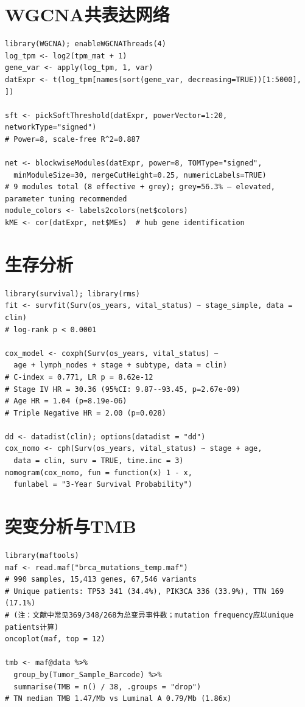 \documentclass[12pt,a4paper,openany]{ctexbook}
\begin{document}
\section{WGCNA共表达网络}
\begin{lstlisting}[caption={WGCNA网络构建}, basicstyle=\ttfamily\scriptsize]
library(WGCNA); enableWGCNAThreads(4)
log_tpm <- log2(tpm_mat + 1)
gene_var <- apply(log_tpm, 1, var)
datExpr <- t(log_tpm[names(sort(gene_var, decreasing=TRUE))[1:5000], ])

sft <- pickSoftThreshold(datExpr, powerVector=1:20, networkType="signed")
# Power=8, scale-free R^2=0.887

net <- blockwiseModules(datExpr, power=8, TOMType="signed",
  minModuleSize=30, mergeCutHeight=0.25, numericLabels=TRUE)
# 9 modules total (8 effective + grey); grey=56.3% — elevated, parameter tuning recommended
module_colors <- labels2colors(net$colors)
kME <- cor(datExpr, net$MEs)  # hub gene identification
\end{lstlisting}

\section{生存分析}
\begin{lstlisting}[caption={KM/Cox/Nomogram}, basicstyle=\ttfamily\scriptsize]
library(survival); library(rms)
fit <- survfit(Surv(os_years, vital_status) ~ stage_simple, data = clin)
# log-rank p < 0.0001

cox_model <- coxph(Surv(os_years, vital_status) ~
  age + lymph_nodes + stage + subtype, data = clin)
# C-index = 0.771, LR p = 8.62e-12
# Stage IV HR = 30.36 (95%CI: 9.87--93.45, p=2.67e-09)
# Age HR = 1.04 (p=8.19e-06)
# Triple Negative HR = 2.00 (p=0.028)

dd <- datadist(clin); options(datadist = "dd")
cox_nomo <- cph(Surv(os_years, vital_status) ~ stage + age,
  data = clin, surv = TRUE, time.inc = 3)
nomogram(cox_nomo, fun = function(x) 1 - x,
  funlabel = "3-Year Survival Probability")
\end{lstlisting}

\section{突变分析与TMB}
\begin{lstlisting}[caption={maftools突变分析与TMB}, basicstyle=\ttfamily\scriptsize]
library(maftools)
maf <- read.maf("brca_mutations_temp.maf")
# 990 samples, 15,413 genes, 67,546 variants
# Unique patients: TP53 341 (34.4%), PIK3CA 336 (33.9%), TTN 169 (17.1%)
# (注：文献中常见369/348/268为总变异事件数；mutation frequency应以unique patients计算)
oncoplot(maf, top = 12)

tmb <- maf@data %>%
  group_by(Tumor_Sample_Barcode) %>%
  summarise(TMB = n() / 38, .groups = "drop")
# TN median TMB 1.47/Mb vs Luminal A 0.79/Mb (1.86x)
\end{lstlisting}
\end{document}
